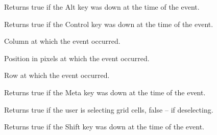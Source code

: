 
\label{wxgrideventaltdown}


Returns true if the Alt key was down at the time of the event.

\label{wxgrideventcontroldown}


Returns true if the Control key was down at the time of the event.

\label{wxgrideventgetcol}


Column at which the event occurred.

\label{wxgrideventgetposition}


Position in pixels at which the event occurred.

\label{wxgrideventgetrow}


Row at which the event occurred.

\label{wxgrideventmetadown}


Returns true if the Meta key was down at the time of the event.

\label{wxgrideventselecting}


Returns true if the user is selecting grid cells, false -- if
deselecting.

\label{wxgrideventshiftdown}


Returns true if the Shift key was down at the time of the event.

\section{}\label{wxgridrangeselectevent}


\\
\\
\\

